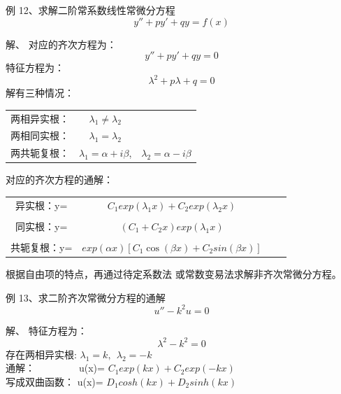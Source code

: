 \begin{frame}
\begin{exampleblock} {例 12、求解二阶常系数线性常微分方程}
	\begin{equation*}
		y''+py'+qy=f(x)
	\end{equation*}
	\end{exampleblock}
	\alert{解、} 对应的齐次方程为：
	\begin{equation*}
		y''+py'+qy=0
	\end{equation*}
	特征方程为：
	\begin{equation*}
		\lambda^2 +p\lambda +q=0
	\end{equation*}
	解有三种情况：
	\begin{table} [H]
	\begin{tabular}{ccc}
		两相异实根：& $\lambda_1 \ne \lambda_2 $ & \\
		两相同实根：& $\lambda_1 = \lambda_2 $  &\\
		两共轭复根：& $\lambda_1=\alpha+i\beta $, & $\lambda_2=\alpha-i\beta$\\ 
	\end{tabular}
	\end{table}
\end{frame}

\begin{frame}
	对应的齐次方程的通解：
	\begin{table} [H]
	\begin{tabular}{cccc}
		异实根：y=& $C_1 exp(\lambda_1 x)+ C_2 exp (\lambda_2 x) $  \\  
		\\
		同实根：y=&$(C_1+C_2x)  exp (\lambda_1 x) $   \\  
		\\
		共轭复根：y=& $ exp(\alpha x)  [C_1 \cos (\beta x)+ C_2 sin (\beta x)] $\\   
	\end{tabular}
	\end{table}
	根据自由项的特点，再通过待定系数法 或常数变易法求解非齐次常微分方程。
\end{frame}

\begin{frame}
\begin{exampleblock} {例 13、求二阶齐次常微分方程的通解}
	\begin{equation*}
		u''-k^2u=0
	\end{equation*}
	\end{exampleblock}
	\alert{解、}  特征方程为：
	\begin{equation*}
		\lambda^2 -k^2=0
	\end{equation*}
	存在两相异实根: $\lambda_1=k, ~~ \lambda_2 =-k $ \\    	\vspace{0.3cm}
	通解：~~~~~~~~~u(x)= $C_1 exp(k x)+ C_2 exp (-k x) $  \\  	\vspace{0.3cm}
	写成双曲函数： u(x)= $D_1 cosh(k x)+ D_2 sinh (k x) $  \\
\end{frame}

